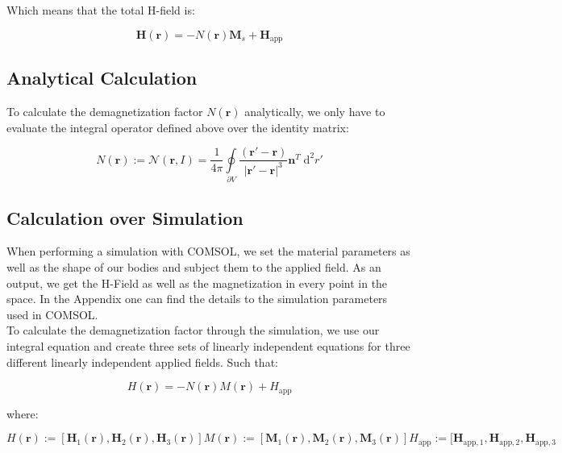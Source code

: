 Which means that the total H-field is:

\begin{equation}
\textbf{H}(\textbf{r}) = -N(\textbf{r})\textbf{M}_s  + \textbf{H}_\text{app}
\end{equation}

\subsection{Analytical Calculation}

To calculate the demagnetization factor $N(\textbf{r})$ analytically, we only have to evaluate the integral operator defined above over the identity matrix:

\begin{equation}
N(\textbf{r}) := \mathcal{N}(\textbf{r},I) = \frac{1}{4\pi}\oint\limits_{\partial V}  \frac{(\textbf{r}'-\textbf{r})}{|\textbf{r}'-\textbf{r}|^3}\textbf{n}^T\;\mathrm{d}^2r'
\end{equation}


\subsection{Calculation over Simulation}

When performing a simulation with COMSOL, we set the material parameters as well as the shape of our bodies and subject them to the applied field. As an output, we get the H-Field as well as the magnetization in every point in the space. In the Appendix one can find the details to the simulation parameters used in COMSOL.\\

To calculate the demagnetization factor through the simulation, we use our integral equation and create three sets of linearly independent equations for three different linearly independent applied fields. Such that:

\begin{equation}
H(\textbf{r}) = -N(\textbf{r})M(\textbf{r}) + H_\text{app}
\end{equation}

where:

\begin{subequations}
\begin{equation}
H(\textbf{r}) := [\textbf{H}_1(\textbf{r}), \textbf{H}_2(\textbf{r}), \textbf{H}_3(\textbf{r})]
\end{equation}
\begin{equation}
M(\textbf{r}) := [\textbf{M}_1(\textbf{r}), \textbf{M}_2(\textbf{r}), \textbf{M}_3(\textbf{r})]
\end{equation}
\begin{equation}
H_\text{app} := [\textbf{H}_{\text{app},1}, \textbf{H}_{\text{app},2}, \textbf{H}_{\text{app},3}
\end{equation}
\end{subequations}


